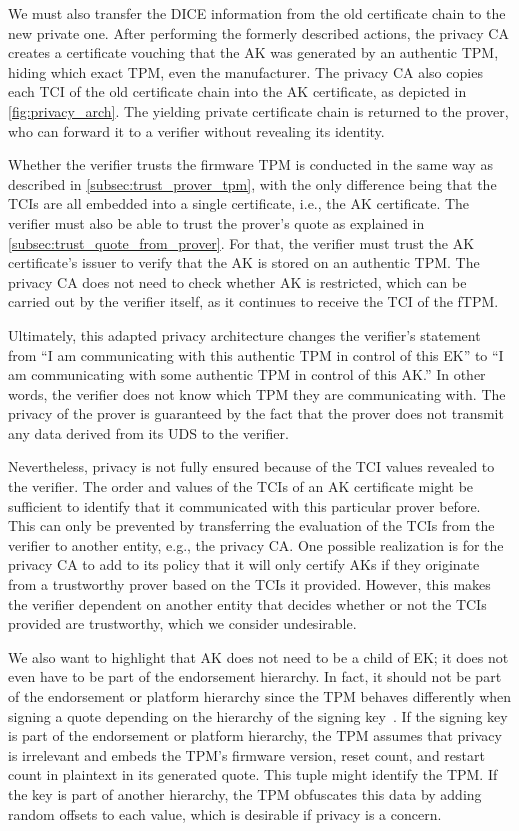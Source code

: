 

We must also transfer the DICE information from the old certificate chain to the new private one.
After performing the formerly described actions, the privacy CA creates a certificate vouching that the AK was generated by an authentic TPM, hiding which exact TPM, even the manufacturer.
The privacy CA also copies each TCI of the old certificate chain into the AK certificate, as depicted in \autoref{fig:privacy_arch}.
The yielding private certificate chain is returned to the prover, who can forward it to a verifier without revealing its identity.

Whether the verifier trusts the firmware TPM is conducted in the same way as described in \autoref{subsec:trust_prover_tpm}, with the only difference being that the TCIs are all embedded into a single certificate, i.e., the AK certificate.
The verifier must also be able to trust the prover's quote as explained in \autoref{subsec:trust_quote_from_prover}.
For that, the verifier must trust the AK certificate's issuer to verify that the \ac{AK} is stored on an authentic TPM\@.
The privacy CA does not need to check whether AK is restricted, which can be carried out by the verifier itself, as it continues to receive the TCI of the fTPM\@.

Ultimately, this adapted privacy architecture changes the verifier's statement from ``I am communicating with this authentic TPM in control of this EK'' to ``I am communicating with some authentic TPM in control of this AK.''
In other words, the verifier does not know which TPM they are communicating with.
The privacy of the prover is guaranteed by the fact that the prover does not transmit any data derived from its \ac{UDS} to the verifier.

Nevertheless, privacy is not fully ensured because of the TCI values revealed to the verifier.
The order and values of the TCIs of an AK certificate might be sufficient to identify that it communicated with this particular prover before.
This can only be prevented by transferring the evaluation of the TCIs from the verifier to another entity, e.g., the privacy CA\@.
One possible realization is for the privacy CA to add to its policy that it will only certify AKs if they originate from a trustworthy prover based on the TCIs it provided.
However, this makes the verifier dependent on another entity that decides whether or not the TCIs provided are trustworthy, which we consider undesirable.

We also want to highlight that AK does not need to be a child of EK\@; it does not even have to be part of the endorsement hierarchy.
In fact, it should not be part of the endorsement or platform hierarchy since the TPM behaves differently when signing a quote depending on the hierarchy of the signing key~\cite{tpm20}.
If the signing key is part of the endorsement or platform hierarchy, the TPM assumes that privacy is irrelevant and embeds the TPM's firmware version, reset count, and restart count in plaintext in its generated quote.
This tuple might identify the TPM\@.
If the key is part of another hierarchy, the TPM obfuscates this data by adding random offsets to each value, which is desirable if privacy is a concern.

